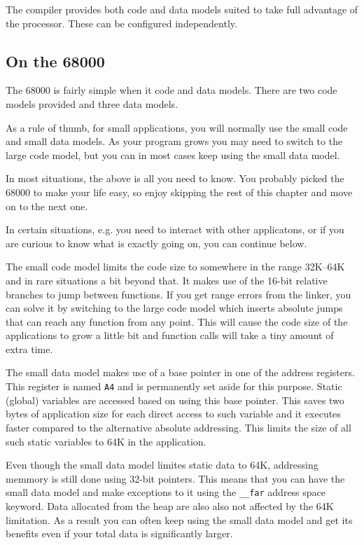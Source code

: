 The compiler provides both code and data models suited to take full
advantage of the processor. These can be configured independently.

\subsection*{On the 68000}

The 68000 is fairly simple when it code and data models. There are two
code models provided and three data models.

As a rule of thumb, for small applications, you will normally use the
small code and small data models. As your program grows you may need
to switch to the large code model, but you can in most cases keep
using the small data model.

In most situations, the above is all you need to know. You probably
picked the 68000 to make your life easy, so enjoy skipping the rest of
this chapter and move on to the next one.

In certain situations, e.g. you need to interact with other
applicatons, or if you are curious to know what is exactly going on,
you can continue below.

The small code model limits the code size to somewhere in the range
32K--64K and in rare situations a bit beyond that. It makes use of the
16-bit relative branches to jump between functions. If you get range
errors from the linker, you can solve it by switching to the large
code model which inserts absolute jumps that can reach any function
from any point. This will cause the code size of the applications to
grow a little bit and function calls will take a tiny amount of extra
time.

The small data model makes use of a base pointer in one of the address
registers. This register is named {\tt A4} and is permanently set
aside for this purpose. Static (global) variables are accessed based
on using this base pointer. This saves two bytes of application size
for each direct access to such variable and it executes faster
compared to the alternative absolute addressing. This limits the size
of all such static variables to 64K in the application.

Even though the small data model limites static data to 64K,
addressing memmory is still done using 32-bit pointers. This means
that you can have the small data model and make exceptions to it using
the {\tt \_\_far} address space keyword. Data allocated from the heap are
also also not affected by the 64K limitation.
As a result you can often keep using the small data model and get its
benefits even if your total data is significantly larger.


